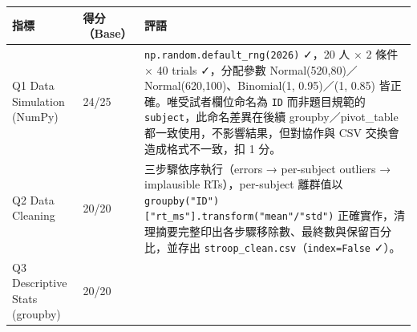 \documentclass[
  14pt,
]{extarticle}
\begin{document}
\begin{longtable}[]{@{}lll@{}}
\toprule
\begin{minipage}[b]{0.10\columnwidth}\raggedright
指標\strut
\end{minipage} & \begin{minipage}[b]{0.04\columnwidth}\raggedright
得分（Base）\strut
\end{minipage} & \begin{minipage}[b]{0.77\columnwidth}\raggedright
評語\strut
\end{minipage}\tabularnewline
\midrule
\endhead
\begin{minipage}[t]{0.10\columnwidth}\raggedright
Q1 Data Simulation (NumPy)\strut
\end{minipage} & \begin{minipage}[t]{0.04\columnwidth}\raggedright
24/25\strut
\end{minipage} & \begin{minipage}[t]{0.77\columnwidth}\raggedright
\texttt{np.random.default\_rng(2026)} ✓，20 人 × 2 條件 × 40 trials
✓，分配參數 Normal(520,80)／Normal(620,100)、Binomial(1, 0.95)／(1,
0.85) 皆正確。唯受試者欄位命名為 \texttt{ID} 而非題目規範的
\texttt{subject}，此命名差異在後續 groupby／pivot\_table
都一致使用，不影響結果，但對協作與 CSV 交換會造成格式不一致，扣 1
分。\strut
\end{minipage}\tabularnewline
\begin{minipage}[t]{0.10\columnwidth}\raggedright
Q2 Data Cleaning\strut
\end{minipage} & \begin{minipage}[t]{0.04\columnwidth}\raggedright
20/20\strut
\end{minipage} & \begin{minipage}[t]{0.77\columnwidth}\raggedright
三步驟依序執行（errors → per-subject outliers → implausible
RTs），per-subject 離群值以
\texttt{groupby("ID"){[}"rt\_ms"{]}.transform("mean"/"std")}
正確實作，清理摘要完整印出各步驟移除數、最終數與保留百分比，並存出
\texttt{stroop\_clean.csv}（\texttt{index=False} ✓）。\strut
\end{minipage}\tabularnewline
\begin{minipage}[t]{0.10\columnwidth}\raggedright
Q3 Descriptive Stats (groupby)\strut
\end{minipage} & \begin{minipage}[t]{0.04\columnwidth}\raggedright
20/20\strut
\end{minipage} & \begin{minipage}[t]{0.77\columnwidth}\raggedright

\end{minipage}
\end{longtable}
\end{document}
